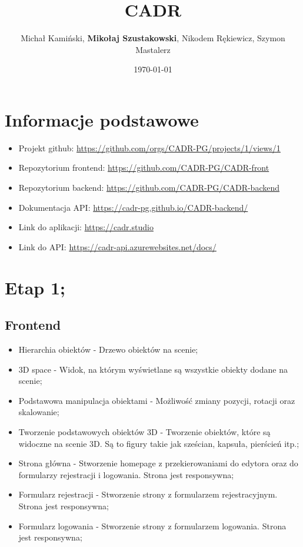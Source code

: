 \documentclass[11pt]{article}
\author{Michał Kamiński, \textbf{Mikołaj Szustakowski}, Nikodem Rękiewicz, Szymon Mastalerz}
\date{\today}
\title{CADR}
\begin{document}
\maketitle
\tableofcontents

\section{Informacje podstawowe}
\label{sec:org187a775}
\begin{itemize}
\item Projekt github: \url{https://github.com/orgs/CADR-PG/projects/1/views/1}
\item Repozytorium frontend: \url{https://github.com/CADR-PG/CADR-front}
\item Repozytorium backend: \url{https://github.com/CADR-PG/CADR-backend}
\item Dokumentacja API: \url{https://cadr-pg.github.io/CADR-backend/}
\item Link do aplikacji: \url{https://cadr.studio}
\item Link do API: \url{https://cadr-api.azurewebsites.net/docs/}
\end{itemize}
\section{Etap 1;}
\label{sec:org82bc7f4}
\subsection{Frontend}
\label{sec:orgd27cd53}
\begin{itemize}
\item Hierarchia obiektów - Drzewo obiektów na scenie;
\item 3D space - Widok, na którym wyświetlane są wszystkie obiekty dodane na scenie;
\item Podstawowa manipulacja obiektami - Możliwość zmiany pozycji, rotacji oraz skalowanie;
\item Tworzenie podstawowych obiektów 3D - Tworzenie obiektów, które są widoczne na scenie 3D. Są to figury takie jak sześcian, kapsuła, pierścień itp.;
\item Strona główna - Stworzenie homepage z przekierowaniami do edytora oraz do formularzy rejestracji i logowania. Strona jest responsywna;
\item Formularz rejestracji - Stworzenie strony z formularzem rejestracyjnym. Strona jest responsywna;
\item Formularz logowania -  Stworzenie strony z formularzem logowania. Strona jest responsywna;
\end{itemize}
\end{document}
